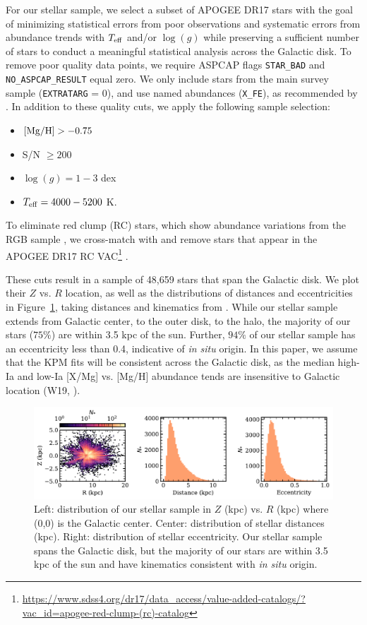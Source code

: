 \documentclass[modern, linenumbers]{aastex631}
\newcommand{\mgh}{[{\rm Mg}/{\rm H}]}
\newcommand{\logg}{\log(g)}
\newcommand{\teff}{T_{\rm eff}}
\begin{document}
For our stellar sample, we select a subset of APOGEE DR17 stars with the goal of minimizing statistical errors from poor observations and systematic errors from abundance trends with $\teff$ and/or $\logg$ while preserving a sufficient number of stars to conduct a meaningful statistical analysis across the Galactic disk. To remove poor quality data points, we require ASPCAP flags \texttt{STAR\_BAD} and \texttt{NO\_ASPCAP\_RESULT} equal zero. We only include stars from the main survey sample (\texttt{EXTRATARG} = 0), and use named abundances (\texttt{X\_FE}), as recommended by \citet{jonsson2020}. In addition to these quality cuts, we apply the following sample selection:
\begin{itemize}
\itemsep0em
    \item $\mgh > -0.75$
    \item S/N $\geq 200$
    \item $\logg = 1-3$ dex
    \item $\teff = 4000-5200$ K.
\end{itemize}
To eliminate red clump (RC) stars, which show abundance variations from the RGB sample \citep{vincenzo2021a}, we cross-match with and remove stars that appear in the APOGEE DR17 RC VAC\footnote{\url{https://www.sdss4.org/dr17/data_access/value-added-catalogs/?vac_id=apogee-red-clump-(rc)-catalog}} \citep{bovy2014}. 

These cuts result in a sample of 48,659 stars that span the Galactic disk. We plot their $Z$ vs. $R$ location, as well as the distributions of distances and eccentricities in Figure~\ref{fig:star_dist}, taking distances and kinematics from \citep{queiroz2023}. While our stellar sample extends from Galactic center, to the outer disk, to the halo, the majority of our stars ($75\%$) are within 3.5 kpc of the sun. Further, $94\%$ of our stellar sample has an eccentricity less than 0.4, indicative of \textit{in situ} origin. In this paper, we assume that the KPM fits will be consistent across the Galactic disk, as the median high-Ia and low-Ia [X/Mg] vs. [Mg/H] abundance tends are insensitive to Galactic location (W19, \citealp{griffith2021a}).  
\begin{figure}[htb!]
    \centering
    \includegraphics[width=\textwidth]{Paper/Figures/star_sample.pdf}
    \caption{Left: distribution of our stellar sample in $Z$ (kpc) vs. $R$ (kpc) where (0,0) is the Galactic center. Center: distribution of stellar distances (kpc). Right: distribution of stellar eccentricity. Our stellar sample spans the Galactic disk, but the majority of our stars are within 3.5 kpc of the sun and have kinematics consistent with \textit{in situ} origin.}
    \label{fig:star_dist}
\end{figure}
\end{document}
